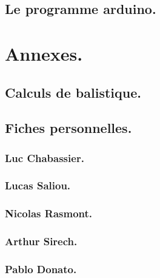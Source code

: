 \documentclass{report}
\begin{document}
\chapter{Le programme arduino.} \label{ardui}


\part{Annexes.}
\appendix
\chapter{Calculs de balistique.} \label{balis}


\chapter{Fiches personnelles.}
\section{Luc Chabassier.}

\section{Lucas Saliou.}

\section{Nicolas Rasmont.}

\section{Arthur Sirech.}

\section{Pablo Donato.}


\newpage
\listoffigures
{}
\end{document}

